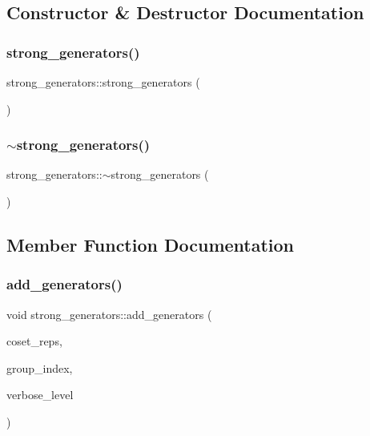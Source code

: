 \subsection{Constructor \& Destructor Documentation}
\mbox{\label{classstrong__generators_a21fe01627384464cd600bd858acb6c40}} 
\subsubsection{\texorpdfstring{strong\+\_\+generators()}{strong\_generators()}}
{\footnotesize\ttfamily strong\+\_\+generators\+::strong\+\_\+generators (\begin{DoxyParamCaption}{ }\end{DoxyParamCaption})}

\mbox{\label{classstrong__generators_afced418ea8f5d6ed5828d8cbc423f0db}} 
\subsubsection{\texorpdfstring{$\sim$strong\+\_\+generators()}{~strong\_generators()}}
{\footnotesize\ttfamily strong\+\_\+generators\+::$\sim$strong\+\_\+generators (\begin{DoxyParamCaption}{ }\end{DoxyParamCaption})}



\subsection{Member Function Documentation}
\mbox{\label{classstrong__generators_a75299be04feeb9809ebc0bc9c809410e}} 
\subsubsection{\texorpdfstring{add\+\_\+generators()}{add\_generators()}}
{\footnotesize\ttfamily void strong\+\_\+generators\+::add\+\_\+generators (\begin{DoxyParamCaption}\item[{\mbox{\hyperlink{classvector__ge}{vector\+\_\+ge}} $\ast$}]{coset\+\_\+reps,  }\item[{\mbox{\hyperlink{galois_8h_a09fddde158a3a20bd2dcadb609de11dc}{I\+NT}}}]{group\+\_\+index,  }\item[{\mbox{\hyperlink{galois_8h_a09fddde158a3a20bd2dcadb609de11dc}{I\+NT}}}]{verbose\+\_\+level }\end{DoxyParamCaption})}

